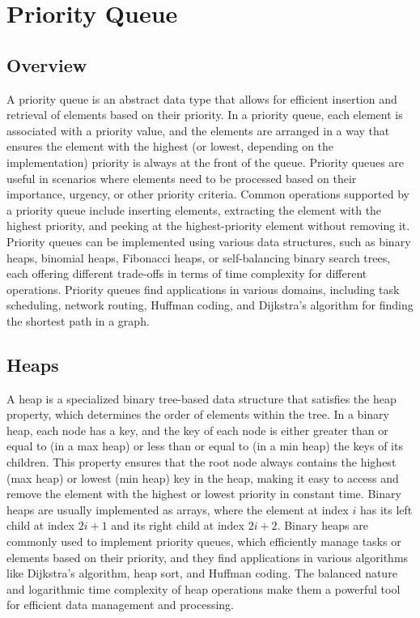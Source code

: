 \clearpage

\section*{Priority Queue}

\subsection*{Overview}

A priority queue is an abstract data type that allows for efficient insertion and retrieval of elements based on their priority. In a priority queue, each element is associated with a priority value, 
and the elements are arranged in a way that ensures the element with the highest (or lowest, depending on the implementation) priority is always at the front of the queue. Priority queues are useful 
in scenarios where elements need to be processed based on their importance, urgency, or other priority criteria. Common operations supported by a priority queue include inserting elements, extracting 
the element with the highest priority, and peeking at the highest-priority element without removing it. Priority queues can be implemented using various data structures, such as binary heaps, binomial 
heaps, Fibonacci heaps, or self-balancing binary search trees, each offering different trade-offs in terms of time complexity for different operations. Priority queues find applications in various 
domains, including task scheduling, network routing, Huffman coding, and Dijkstra's algorithm for finding the shortest path in a graph.

\subsection*{Heaps}

A heap is a specialized binary tree-based data structure that satisfies the heap property, which determines the order of elements within the tree. In a binary heap, each node has a key, and the key of 
each node is either greater than or equal to (in a max heap) or less than or equal to (in a min heap) the keys of its children. This property ensures that the root node always contains the highest 
(max heap) or lowest (min heap) key in the heap, making it easy to access and remove the element with the highest or lowest priority in constant time. Binary heaps are usually implemented as arrays, 
where the element at index $i$ has its left child at index $2i+1$ and its right child at index $2i+2$. Binary heaps are commonly used to implement priority queues, which efficiently manage tasks or 
elements based on their priority, and they find applications in various algorithms like Dijkstra's algorithm, heap sort, and Huffman coding. The balanced nature and logarithmic time complexity of heap 
operations make them a powerful tool for efficient data management and processing.

